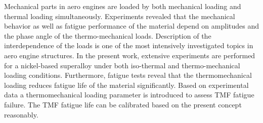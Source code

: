 
Mechanical parts in aero engines are loaded by both mechanical loading and thermal loading simultaneously. Experiments revealed that the mechanical behavior as well as fatigue performance of the material depend on amplitudes and the phase angle of the thermo-mechanical loads. Description of the interdependence of the loads is one of the most intensively investigated topics in aero engine structures. In the present work, extensive experiments are performed for a nickel-based superalloy under both iso-thermal and thermo-mechanical loading conditions. Furthermore, fatigue tests reveal that the thermomechanical loading reduces fatigue life of the material significantly. Based on experimental data a thermomechanical loading parameter is introduced to assess TMF fatigue failure. The TMF fatigue life can be calibrated based on the present concept reasonably. 